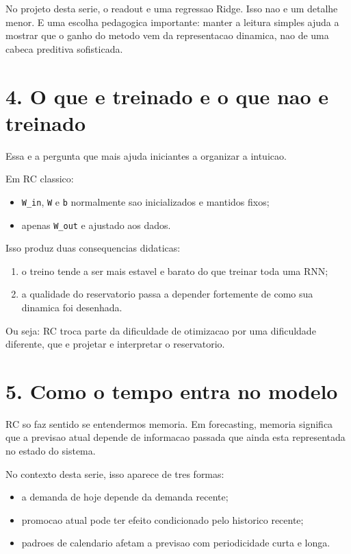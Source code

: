 \documentclass[12pt]{article}
\providecommand{\tightlist}{%
  \setlength{\itemsep}{0pt}\setlength{\parskip}{0pt}}
\begin{document}
No projeto desta serie, o readout e uma regressao Ridge. Isso nao e um detalhe menor. E uma escolha pedagogica importante: manter a leitura simples ajuda a mostrar que o ganho do metodo vem da representacao dinamica, nao de uma cabeca preditiva sofisticada.

\section{4. O que e treinado e o que nao e treinado}\label{4-o-que-e-treinado-e-o-que-nao-e-treinado}

Essa e a pergunta que mais ajuda iniciantes a organizar a intuicao.

Em RC classico:

\begin{itemize}
\tightlist
\item
  \texttt{W\_in}, \texttt{W} e \texttt{b} normalmente sao inicializados e mantidos fixos;
\item
  apenas \texttt{W\_out} e ajustado aos dados.
\end{itemize}

Isso produz duas consequencias didaticas:

\begin{enumerate}
\def\labelenumi{\arabic{enumi}.}
\tightlist
\item
  o treino tende a ser mais estavel e barato do que treinar toda uma RNN;
\item
  a qualidade do reservatorio passa a depender fortemente de como sua dinamica foi desenhada.
\end{enumerate}

Ou seja: RC troca parte da dificuldade de otimizacao por uma dificuldade diferente, que e projetar e interpretar o reservatorio.

\section{5. Como o tempo entra no modelo}\label{5-como-o-tempo-entra-no-modelo}

RC so faz sentido se entendermos memoria. Em forecasting, memoria significa que a previsao atual depende de informacao passada que ainda esta representada no estado do sistema.

No contexto desta serie, isso aparece de tres formas:

\begin{itemize}
\tightlist
\item
  a demanda de hoje depende da demanda recente;
\item
  promocao atual pode ter efeito condicionado pelo historico recente;
\item
  padroes de calendario afetam a previsao com periodicidade curta e longa.
\end{itemize}
\end{document}
